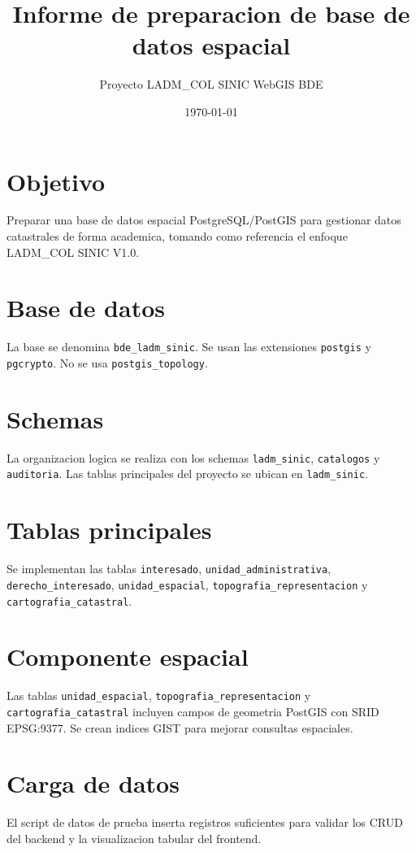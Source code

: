 \documentclass[12pt]{article}
\title{Informe de preparacion de base de datos espacial}
\author{Proyecto LADM\_COL SINIC WebGIS BDE}
\date{\today}
\begin{document}
\maketitle

\section{Objetivo}
Preparar una base de datos espacial PostgreSQL/PostGIS para gestionar datos
catastrales de forma academica, tomando como referencia el enfoque
LADM\_COL SINIC V1.0.

\section{Base de datos}
La base se denomina \texttt{bde\_ladm\_sinic}. Se usan las extensiones
\texttt{postgis} y \texttt{pgcrypto}. No se usa \texttt{postgis\_topology}.

\section{Schemas}
La organizacion logica se realiza con los schemas \texttt{ladm\_sinic},
\texttt{catalogos} y \texttt{auditoria}. Las tablas principales del proyecto se
ubican en \texttt{ladm\_sinic}.

\section{Tablas principales}
Se implementan las tablas \texttt{interesado},
\texttt{unidad\_administrativa}, \texttt{derecho\_interesado},
\texttt{unidad\_espacial}, \texttt{topografia\_representacion} y
\texttt{cartografia\_catastral}.

\section{Componente espacial}
Las tablas \texttt{unidad\_espacial}, \texttt{topografia\_representacion} y
\texttt{cartografia\_catastral} incluyen campos de geometria PostGIS con SRID
EPSG:9377. Se crean indices GIST para mejorar consultas espaciales.

\section{Carga de datos}
El script de datos de prueba inserta registros suficientes para validar los
CRUD del backend y la visualizacion tabular del frontend.
\end{document}
